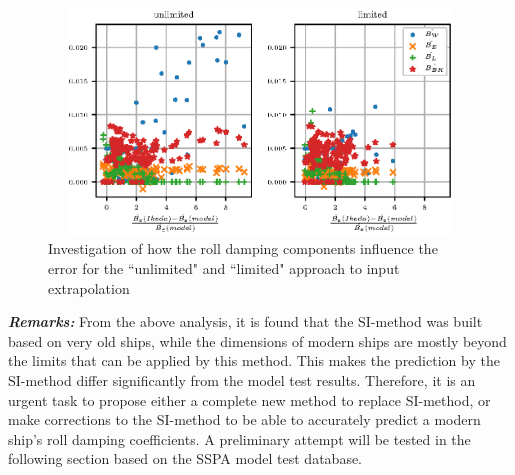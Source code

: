 \begin{figure}[H]
\vspace{-0.5cm}
\centering
  \centering
  \includegraphics[height=6cm, width = 12cm]{figures/ikeda_components.eps}
  \vspace{-0.5cm}
  \caption{Investigation of how the roll damping components influence the error for the ``unlimited" and ``limited" approach to input extrapolation}
  \label{fig:ikeda_components}
\end{figure}

\textbf{\textit{Remarks:}} From the above analysis, it is found that the SI-method was built based on very old ships, while the dimensions of modern ships are mostly beyond the limits that can be applied by this method. This makes the prediction by the SI-method differ significantly from the model test results.
Therefore, it is an urgent task to propose either a complete new method to replace SI-method, or make corrections to the SI-method to be able to accurately predict a modern ship's roll damping coefficients. A preliminary attempt will be tested in the following section based on the SSPA model test database.